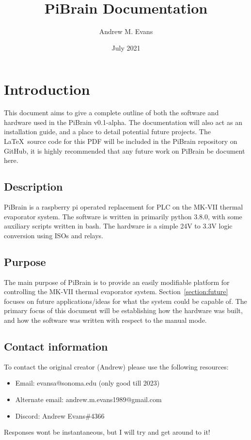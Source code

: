 \documentclass{article}
\title{PiBrain Documentation}
\author{Andrew M. Evans}
\date{July 2021}
\begin{document}
\maketitle

\tableofcontents

\section{Introduction}
This document aims to give a complete outline of both the software and hardware used in the PiBrain v0.1-alpha. The documentation will also act as an installation guide, and a place to detail potential future projects. The \LaTeX\ source code for this PDF will be included in the PiBrain repository on GitHub, it is highly recommended that any future work on PiBrain be document here.\\

\subsection{Description}
PiBrain is a raspberry pi operated replacement for PLC on the MK-VII thermal evaporator system. The software is written in primarily python 3.8.0, with some auxiliary scripts written in bash. The hardware is a simple 24V to 3.3V logic conversion using ISOs and relays.\\

\subsection{Purpose}
The main purpose of PiBrain is to provide an easily modifiable platform for controlling the MK-VII thermal evaporator system. Section~\ref{section:future} focuses on future applications/ideas for what the system could be capable of. The primary focus of this document will be establishing how the hardware was built, and how the software was written with respect to the manual mode.
\subsection{Contact information}

To contact the original creator (Andrew) please use the following resources:
\begin{itemize}
    \item Email: evansa@sonoma.edu (only good till 2023)
    \item Alternate email: andrew.m.evans1989@gmail.com
    \item Discord: Andrew Evans\#4366
\end{itemize}
Responses wont be instantaneous, but I will try and get around to it!
\end{document}
